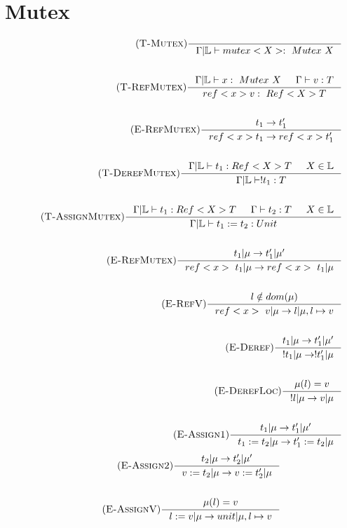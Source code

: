 \documentclass[12pt]{article}
\def\lock {\mathbb{L}}
\begin{document}
\section{Mutex}
\begin{align*}
    \tag {\textsc{T-Mutex}}
    \inference[]{
        }{\Gamma|\lock \vdash mutex<X> :~Mutex~X}
    \\
    \\
    \tag {\textsc{T-RefMutex}}
    \inference[]{\Gamma|\lock \vdash x :~Mutex~X & \Gamma \vdash v:T}{ref<x> v:~Ref<X>T}
    \\
    \\
    \tag {\textsc{E-RefMutex}}
    \inference[]{t_1->t_1'}{ref<x> t_1 -> ref<x> t_1'}
    \\
    \\
    \tag {\textsc{T-DerefMutex}}
    \inference[]{\Gamma|\lock \vdash t_1:Ref<X>T & X\in \lock}{\Gamma|\lock\vdash !t_1:T}
    \\
    \\
    \tag {\textsc{T-AssignMutex}}
    \inference[]{\Gamma|\lock \vdash t_1:Ref<X>T & \Gamma \vdash t_2:T & X\in \lock}{\Gamma|\lock\vdash t_1 := t_2:Unit}
    \\
    \\
    \tag {\textsc{E-RefMutex}}
    \inference[]{t_1|\mu->t_1'|\mu '}{ref<x>~t_1|\mu -> ref<x>~t_1|\mu}
    \\
    \\
    \tag {\textsc{E-RefV}}
    \inference[]{l\notin dom(\mu)}{ref<x>~v|\mu -> l|\mu,l\mapsto v}
    \\
    \\
    \tag {\textsc{E-Deref}}
    \inference[]{t_1|\mu->t_1'|\mu '}{!t_1|\mu -> !t_1'|\mu}
    \\
    \\
    \tag {\textsc{E-DerefLoc}}
    \inference[]{\mu(l)=v}{!l|\mu -> v|\mu}
    \\
    \\
    \tag {\textsc{E-Assign1}}
    \inference[]{t_1|\mu->t_1'|\mu '}{t_1:=t_2|\mu -> t_1':=t_2|\mu}
\end{align*}
\begin{align*}
    \tag {\textsc{E-Assign2}}
    \inference[]{t_2|\mu->t_2'|\mu '}{v:=t_2|\mu -> v:=t_2'|\mu}
    \\
    \\
    \tag {\textsc{E-AssignV}}
    \inference[]{\mu(l)=v}{l:=v|\mu -> unit|\mu,l\mapsto v}
\end{align*}
\end{document}
